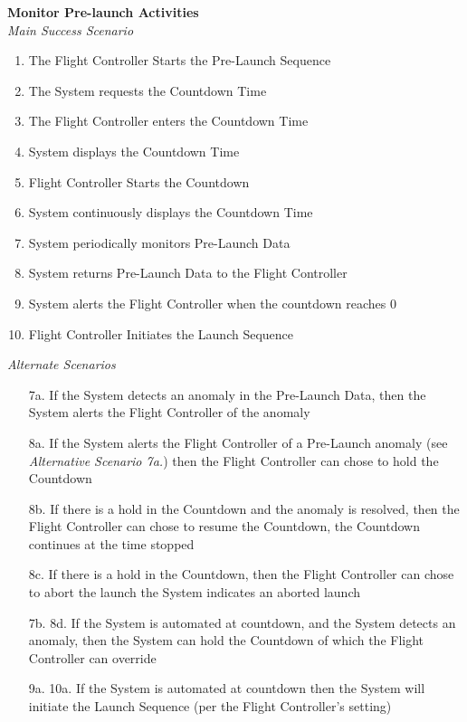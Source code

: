 \documentclass[letterpaper]{article}
\begin{document}
\noindent
\textbf{Monitor Pre-launch Activities}\\
\textit{Main Success Scenario}
\begin{enumerate}
\item The Flight Controller Starts the Pre-Launch Sequence
\item The System requests the Countdown Time
\item The Flight Controller enters the Countdown Time
\item System displays the Countdown Time
\item Flight Controller Starts the Countdown
\item System continuously displays the Countdown Time
\item System periodically monitors Pre-Launch Data
\item System returns Pre-Launch Data to the Flight Controller
\item System alerts the Flight Controller when the countdown reaches 0
\item Flight Controller Initiates the Launch Sequence
\end{enumerate}
\textit{Alternate Scenarios}
\begin{itemize}
\item[7a.]  If the System detects an anomaly in the Pre-Launch
Data, then the System alerts the Flight Controller of the anomaly
\item[8a.]  If the System alerts the Flight Controller of a Pre-Launch
anomaly (see \textit{Alternative Scenario 7a.}) then the Flight
Controller can chose to hold the Countdown
\item[8b.]  If there is a hold in the Countdown and the anomaly is
resolved, then the Flight Controller can chose to resume the
Countdown, the Countdown continues at the time stopped
\item[8c.]  If there is a hold in the Countdown, then the Flight
Controller can chose to abort the launch the System indicates an
aborted launch
\item[7b. 8d.]  If the System is automated at countdown, and the
System detects an anomaly, then the System can hold the Countdown of
which the Flight Controller can override
\item[9a. 10a.] If the System is automated at countdown then the
System will initiate the Launch Sequence (per the Flight
Controller's setting) 
\end{itemize}
\end{document}
